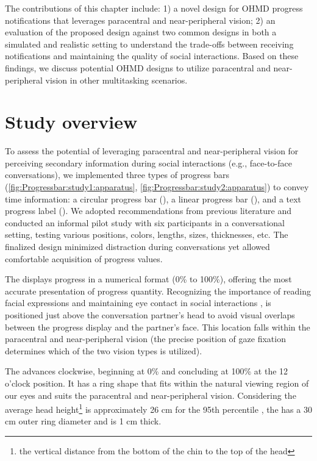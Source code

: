 The contributions of this chapter include: 1) a novel design for OHMD progress notifications that leverages paracentral and near-peripheral vision; 2) an evaluation of the proposed design against two common designs in both a simulated and realistic setting to understand the trade-offs between receiving notifications and maintaining the quality of social interactions. Based on these findings, we discuss potential OHMD designs to utilize paracentral and near-peripheral vision in other multitasking scenarios.












\section{Study overview}
\label{sec:Progressbar:study_overview}

To assess the potential of leveraging paracentral and near-peripheral vision for perceiving secondary information during social interactions (e.g., face-to-face conversations), we implemented three types of progress bars (\autoref{fig:Progressbar:study1:apparatus}, \autoref{fig:Progressbar:study2:apparatus}) to convey time information: a circular progress bar (\circularbar{}), a linear progress bar (\linearbar{}), and a text progress label (\textbar{}). We adopted recommendations from previous literature and conducted an informal pilot study with six participants in a conversational setting, testing various positions, colors, lengths, sizes, thicknesses, etc. The finalized design minimized distraction during conversations yet allowed comfortable acquisition of progress values.

The \textbar{} displays progress in a numerical format (0\% to 100\%), offering the most accurate presentation of progress quantity. Recognizing the importance of reading facial expressions and maintaining eye contact in social interactions \cite{hessels_how_2020, argyle1976gaze}, \textbar{} is positioned just above the conversation partner's head to avoid visual overlaps between the progress display and the partner's face. This location falls within the paracentral and near-peripheral vision (the precise position of gaze fixation determines which of the two vision types is utilized).

The \circularbar{} advances clockwise, beginning at 0\% and concluding at 100\% at the 12 o'clock position. It has a ring shape that fits within the natural viewing region of our eyes and suits the paracentral and near-peripheral vision. Considering the average head height\footnote{the vertical distance from the bottom of the chin to the top of the head} is approximately 26 cm for the 95th percentile \cite[Ch~B.8]{panero1979human}, the \circularbar{} has a 30 cm outer ring diameter and is 1 cm thick.

